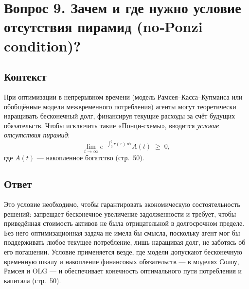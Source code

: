 \section*{Вопрос 9. Зачем и где нужно условие отсутствия пирамид (no‑Ponzi condition)?}

\subsection*{Контекст}
При оптимизации в непрерывном времени (модель Рамсея–Касса–Купманса или обобщённые модели межвременного потребления) 
агенты могут теоретически наращивать бесконечный долг, финансируя текущие расходы за счёт будущих обязательств.
 Чтобы исключить такие «Понци‑схемы», вводится \emph{условие отсутствия пирамид}:
\[
\lim_{t\to\infty} e^{-\int_0^t r(\tau)\,d\tau}A(t)\;\ge\;0,
\]
где \(A(t)\) — накопленное богатство (стр.~50).

\subsection*{Ответ}
Это условие необходимо, чтобы гарантировать экономическую состоятельность решений: запрещает бесконечное увеличение задолженности и
 требует, чтобы приведённая стоимость активов не была отрицательной в долгосрочном пределе. Без него оптимизационная 
 задача не имела бы смысла, поскольку агент мог бы поддерживать любое текущее потребление, лишь наращивая долг, не 
 заботясь об его погашении. Условие применяется везде, где модели допускают бесконечную временную шкалу и накопление финансовых
  обязательств — в моделях Солоу, Рамсея и OLG — и обеспечивает конечность оптимального пути потребления и капитала (стр.~50).
